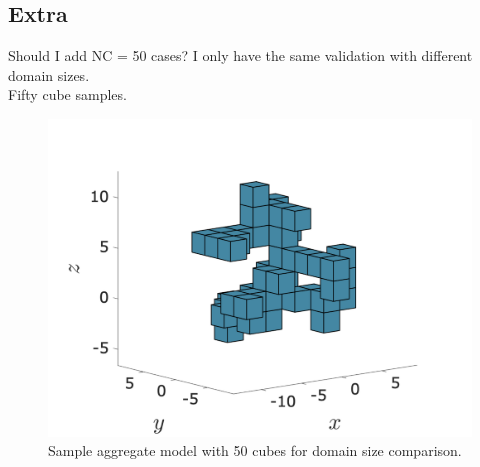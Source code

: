 \subsection{Extra}
{\color{blue} Should I add NC = 50 cases? I only have the same validation with different domain sizes.} \\
Fifty cube samples.
\begin{figure}[ht]
	\begin{center}
		\includegraphics[scale=0.4]{./figures/fig_NC50_sd2}
	\caption{Sample aggregate model with 50 cubes for domain size comparison.}
	\label{fig_NC50_sd2}
\end{center}
\end{figure}

